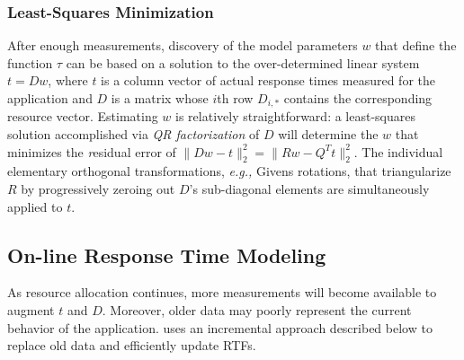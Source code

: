\subsubsection*{Least-Squares Minimization}
After enough measurements, discovery of the model parameters $w$ that define the function $\tau$
can be based on a solution to the over-determined linear system $t=Dw$,
where $t$ is a column vector of actual response times measured for the application
and $D$ is a matrix whose $i$th row $D_{i,*}$ contains the corresponding resource vector.
Estimating $w$ is relatively straightforward: a least-squares solution accomplished via
\emph{QR factorization}\cite{GoVL} of $D$ will determine the $w$ that minimizes the \emph residual error of
$\|Dw - t\|^2_2 =  \|Rw - Q^Tt\|^2_2$.
%
The individual elementary orthogonal transformations, \emph{e.g.,} Givens rotations,
that triangularize $R$ by progressively zeroing out $D$'s sub-diagonal elements are simultaneously applied to $t$.


\subsection{On-line Response Time Modeling}
As resource allocation continues, more measurements will become available to augment $t$ and $D$.
Moreover, older data may poorly represent the current behavior of the application.
\pacora uses an incremental approach described below to replace old data and efficiently update RTFs.

